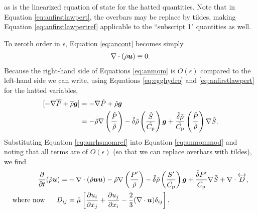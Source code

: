 \documentclass[12pt]{article}
\begin{document}
as is the linearized equation of state for the hatted quantities. Note that in Equation \eqref{eq:anfirstlawpert}, the overbars may be replace by tildes, making Equation \eqref{eq:anfirstlawpertref} applicable to the ``subscript 1" quantities as well. 

To zeroth order in $\epsilon$, Equation \eqref{eq:ancont} becomes simply
\begin{align}\label{eq:refcont}
	\nabla\cdot(\tilde{\rho}\bm{u})\equiv0.
\end{align}
Because the right-hand side of Equations \eqref{eq:anmom} is $O(\epsilon)$ compared to the left-hand side we can write, using Equations \eqref{eq:egghydro} and \eqref{eq:anfirstlawpert} for the hatted variables,
\begin{align}\label{eq:anrhsmomref}
	[-\nabla \overline{P} + \overline{\rho}\bm{g}] &= -\nabla \hat{P} + \hat{\rho}\bm{g}\nonumber\\
	&= -\tilde{\rho}\nabla\left(\frac{\hat{P}}{\tilde{\rho}}\right) - \tilde{\delta}  \tilde{\rho} \left(\frac{\hat{S}}{\tilde{C_{\rm{p}}}}\right) \bm{g} + \frac{\tilde{\delta} \tilde{\rho}}{\tilde{C_{\rm{p}}}} \left(\frac{\hat{P}}{\tilde{\rho}}\right)\nabla\tilde{S}.
\end{align}
Substituting Equation \eqref{eq:anrhsmomref} into Equation \eqref{eq:anmommod} and noting that all terms are of $O(\epsilon)$ (so that we can replace overbars with tildes), we find
\begin{subequations}\label{eq:refmom}
	\begin{align}\label{eq:refmommain}
	\frac{\partial}{\partial t}(\tilde{\rho}\bm{u})= &-\nabla\cdot(\tilde{\rho}\bm{u}\bm{u}) -\tilde{\rho}\nabla\left(\frac{{P^\prime}}{\tilde{\rho}}\right) - \tilde{\delta} \tilde{\rho} \left(\frac{{S^\prime}}{\tilde{C_{\rm{p}}}}\right) \bm{g} +\frac{\tilde{\delta}  {P^\prime}}{\tilde{C_{\rm{p}}}} \nabla\tilde{S}+\nabla\cdot \overleftrightarrow{D},\\
	\text{where now}\ \ \ \ \  D_{ij}& = \tilde{\mu}\left[\frac{\partial u_i}{\partial x_j} + \frac{\partial u_j}{\partial x_i} - \frac{2}{3}(\nabla\cdot\bm{u})\delta_{ij}\right]\label{eq:refmomvisc},
\end{align}
\end{subequations}
\end{document}
